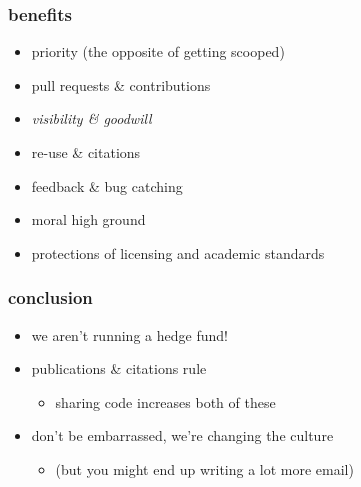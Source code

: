 \documentclass[pdftex]{beamer}
\begin{document}
\begin{frame}
  \frametitle{benefits}
  \begin{itemize}
  \item priority (the opposite of getting scooped)
  \item pull requests \& contributions
  \item \emph{visibility \& goodwill}
  \item re-use \& citations
  \item feedback \& bug catching
  \item moral high ground
  \item protections of licensing and academic standards
  \end{itemize}
\end{frame}

\begin{frame}
  \frametitle{conclusion}
  \begin{itemize}
  \item we aren't running a hedge fund!
  \item publications \& citations rule
    \begin{itemize}
    \item sharing code increases both of these
    \end{itemize}
  \item don't be embarrassed, we're changing the culture
    \begin{itemize}
    \item (but you might end up writing a lot more email)
    \end{itemize}
  \end{itemize}
\end{frame}
\end{document}
